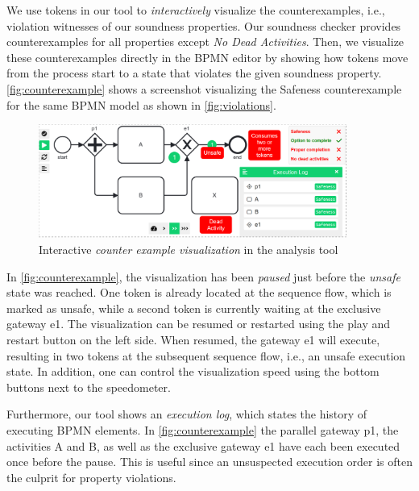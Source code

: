 \documentclass[runningheads]{llncs}
\begin{document}
We use tokens in our tool to \textit{interactively} visualize the counterexamples, i.e., violation witnesses of our soundness properties.
Our soundness checker provides counterexamples for all properties except \textit{No Dead Activities}.
Then, we visualize these counterexamples directly in the BPMN editor by showing how tokens move from the process start to a state that violates the given soundness property.
\autoref{fig:counterexample} shows a screenshot visualizing the Safeness counterexample for the same BPMN model as shown in \autoref{fig:violations}.

\begin{figure}[ht]
	\centering
	\includegraphics[width=0.9\textwidth]{images/counter-example}
	\caption{Interactive \textit{counter example visualization} in the analysis tool}
	\label{fig:counterexample}
\end{figure}

In \autoref{fig:counterexample}, the visualization has been \textit{paused} just before the \textit{unsafe} state was reached.
One token is already located at the sequence flow, which is marked as unsafe, while a second token is currently waiting at the exclusive gateway \textsf{e1}.
The visualization can be resumed or restarted using the play and restart button on the left side.
When resumed, the gateway \textsf{e1} will execute, resulting in two tokens at the subsequent sequence flow, i.e., an unsafe execution state.
In addition, one can control the visualization speed using the bottom buttons next to the speedometer.

Furthermore, our tool shows an \textit{execution log}, which states the history of executing BPMN elements.
In \autoref{fig:counterexample} the parallel gateway \textsf{p1}, the activities \textsf{A} and \textsf{B}, as well as the exclusive gateway \textsf{e1} have each been executed once before the pause.
This is useful since an unsuspected execution order is often the culprit for property violations.
\end{document}
